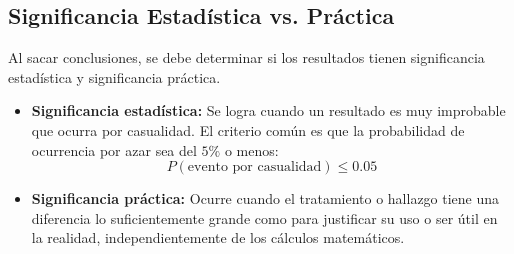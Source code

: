 \subsection{Significancia Estadística vs. Práctica}
Al sacar conclusiones, se debe determinar si los resultados tienen significancia estadística y significancia práctica.
\begin{itemize}
    \item \textbf{Significancia estadística:} Se logra cuando un resultado es muy improbable que ocurra por casualidad. El criterio común es que la probabilidad de ocurrencia por azar sea del $5\%$ o menos:
    $$ P(\text{evento por casualidad}) \leq 0.05 $$
    \item \textbf{Significancia práctica:} Ocurre cuando el tratamiento o hallazgo tiene una diferencia lo suficientemente grande como para justificar su uso o ser útil en la realidad, independientemente de los cálculos matemáticos.
\end{itemize}